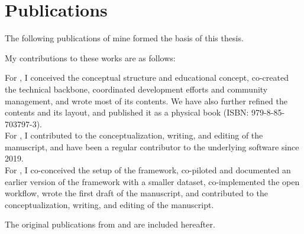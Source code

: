 
\chapter{Publications}

The following publications of mine formed the basis of this thesis.



\begin{refsection}
\nocite{Halchenko2021, wagner2020datalad, wagner2022fairly}
\begin{refcontext}[sorting=nyt]  
	\printbibliography[heading=none, resetnumbers=true]
\end{refcontext}

My contributions to these works are as follows:

For \citet{wagner2020datalad}, I conceived the conceptual structure and educational concept, co-created the technical backbone, coordinated development efforts and community management, and wrote most of its contents.
We have also further refined the contents and its layout, and published it as a physical book (ISBN: 979-8-85-703797-3).\\
For \citet{Halchenko2021}, I contributed to the conceptualization, writing, and editing of the manuscript, and have been a regular contributor to the underlying software since 2019.\\
For \citet{wagner2022fairly}, I co-conceived the setup of the framework, co-piloted and documented an earlier version of the framework with a smaller dataset, co-implemented the open workflow, wrote the first draft of the manuscript, and contributed to the conceptualization, writing, and editing of the manuscript.

The original publications from \citet{Halchenko2021} and \citet{wagner2022fairly} are included hereafter.



\end{refsection}
